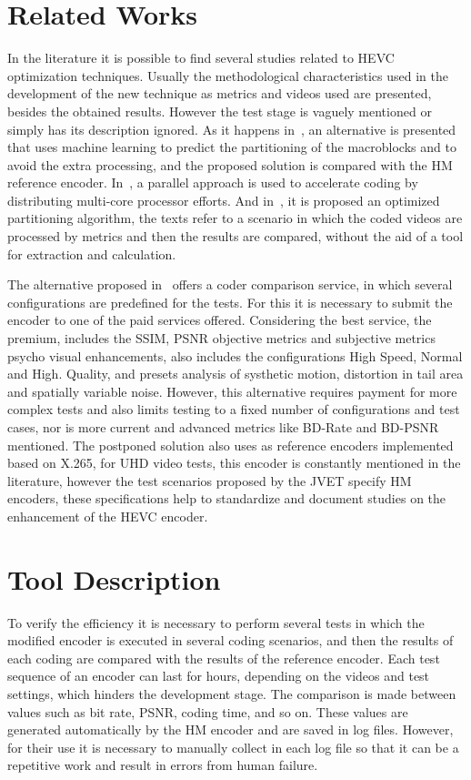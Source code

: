 \documentclass{acm_proc_article-sp}
\begin{document}
\section{Related Works}


In the literature it is possible to find several studies related to HEVC optimization techniques. Usually the methodological characteristics used in the development of the new technique as metrics and videos used are presented, besides the obtained results. However the test stage is vaguely mentioned or simply has its description ignored. As it happens in~\cite{oliveira:16}, an alternative is presented that uses machine learning to predict the partitioning of the macroblocks and to avoid the extra processing, and the proposed solution is compared with the HM reference encoder. In~\cite{Wang:16}, a parallel approach is used to accelerate coding by distributing multi-core processor efforts. And in~\cite{wang:13}, it is proposed an optimized partitioning algorithm, the texts refer to a scenario in which the coded videos are processed by metrics and then the results are compared, without the aid of a tool for extraction and calculation.


The alternative proposed in~\cite{msu:16} offers a coder comparison service, in which several configurations are predefined for the tests. For this it is necessary to submit the encoder to one of the paid services offered. Considering the best service, the premium, includes the SSIM, PSNR objective metrics and subjective metrics psycho visual enhancements, also includes the configurations High Speed, Normal and High. Quality, and presets analysis of systhetic motion, distortion in tail area and spatially variable noise. However, this alternative requires payment for more complex tests and also limits testing to a fixed number of configurations and test cases, nor is more current and advanced metrics like BD-Rate and BD-PSNR mentioned. The postponed solution also uses as reference encoders implemented based on X.265, for UHD video tests, this encoder is constantly mentioned in the literature, however the test scenarios proposed by the JVET specify HM encoders, these specifications help to standardize and document studies on the enhancement of the HEVC encoder.


\section{Tool Description}

To verify the efficiency it is necessary to perform several tests in which the modified encoder is executed in several coding scenarios, and then the results of each coding are compared with the results of the reference encoder. Each test sequence of an encoder can last for hours, depending on the videos and test settings, which hinders the development stage. The comparison is made between values such as bit rate, PSNR, coding time, and so on. These values are generated automatically by the HM encoder and are saved in log files. However, for their use it is necessary to manually collect in each log file so that it can be a repetitive work and result in errors from human failure. 
\end{document}

